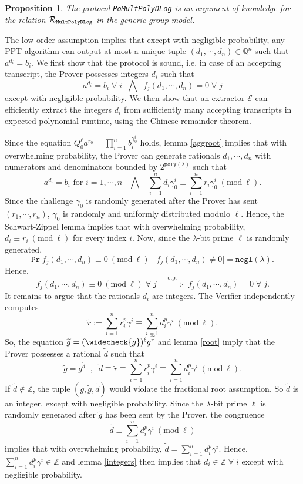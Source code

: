 \documentclass[11pt, lettersize, notitlepage, leqno, footskip=0.6cm]{article}
\newcommand{\bz}{\mathbb Z}
\newcommand{\bq}{\mathbb Q}
\newcommand{\slim}{\sum\limits}
\newcommand{\ttt}{\texttt}
\newcommand{\negl}{\ttt{{negl}}}
\newcommand{\impop}{\overset{\;\;\;\;\mr{o.p.}\;\;\;\;}{\Longrightarrow}}
\newcommand{\wti}{\widetilde}
\newcommand{\mc}{\mathcal}
\newcommand{\mr}{\mathrm}
\newcommand{\lam}{\lambda}
\newcommand{\weck}{\widecheck}
\newcommand{\vs}{\vspace{-0.15cm}}
\newcommand{\op}{overwhelming probability}
\newcommand{\np}{negligible probability}
\newcommand{\Mod}[1]{\ (\mathrm{mod}\ #1)}
\newcommand{\E}{\mc{E}}
\newtheorem{Prop}[Thm]{Proposition}
\numberwithin{equation}{section}
\begin{document}
\vspace{0.2cm}


\begin{Prop}\hyperlink{Mult} {The protocol} \verb|PoMultPolyDLog| is an argument of knowledge for the relation $\mc{R}_{{\tt{MultPolyDLog}}}$ in the generic group model.\end{Prop}

\begin{prf} The low order assumption implies that except with \np, any PPT algorithm can output at most a unique tuple $(d_1,\cdots,d_n)\in\bq^n$ such that $a^{d_i} = b_i$. We first show that the protocol is sound, i.e. in case of an accepting transcript, the Prover possesses integers $d_i$ such that $$a^{d_i} = b_i\;\forall\; i\;\;\bigwedge\;\;f_j(d_1,\cdots,d_n) = 0\;\forall\; j $$ except with \np.  We then show that an extractor $\E$ can efficiently extract the integers $d_i$ from sufficiently many accepting transcripts in expected polynomial runtime, using the Chinese remainder theorem.

Since the equation $Q_0^{\ell} a^{r_0} = \prod_{i=1}^n b_i^{\gamma_{0}^i}$ holds, lemma \ref{aggroot} implies that with \op, the Prover can generate rationals $d_1,\cdots,d_n$ with numerators and denominators bounded by $2^{\ttt{poly}(\lam)}$ such that \vs $$a^{d_i} = b_i \text{ for } i=1,\cdots,n \;\;\;\bigwedge\;\;\; \sum\limits_{i=1}^n d_i\gamma_{0}^i\equiv \sum\limits_{i=1}^n r_i\gamma_{0}^i\Mod{\ell}.$$ Since the challenge $\gamma_{0}$ is randomly generated after the Prover has sent $(r_1,\cdots,r_n)$, $\gamma_{0}$ is randomly and uniformly distributed modulo $\ell$. Hence, the Schwart-Zippel lemma implies that with \op, $d_i\equiv r_i\Mod{\ell}$ for every index $i$. Now, since the $\lam$-bit prime $\ell$ is randomly generated, \vs $$\ttt{Pr}\Big[f_j(d_1,\cdots,d_n)\equiv 0\Mod{\ell} \;\Big|\; f_j(d_1,\cdots,d_n)\neq 0 \Big] = \negl(\lam) .$$ Hence, $$f_j(d_1,\cdots,d_n)\equiv 0\Mod{\ell}\;\forall\;j\;\impop\; f_j(d_1,\cdots,d_n) = 0 \;\forall\;j.$$ It remains to argue that the rationals $d_i$ are integers. The Verifier independently computes $$\wti{r}:= \slim_{i=1}^n r_i^{p}\gamma^i\equiv \slim_{i=1}^n d_i^{p}\gamma^i\Mod{\ell}.$$ So, the equation $\wti{g} = (\weck{g})^{\ell}g^{\wti{r}} $ and lemma \ref{root} imply that the Prover possesses a rational $\wti{d}$ such that \vs $$\wti{g} = g^{\wti{d}}\;\;,\;\;\wti{d}\equiv \wti{r}\equiv \slim_{i=1}^n r_i^p\gamma^i\equiv \slim_{i=1}^n d_i^p\gamma^i\Mod{\ell}.$$ If $\wti{d}\notin\bz$, the tuple $(g, \wti{g}, \wti{d})$ would violate the fractional root assumption. So $\wti{d}$ is an integer, except with negligible probability. Since the $\lam$-bit prime $\ell$ is randomly generated after $\wti{g}$ has been sent by the Prover, the congruence \vs $$\wti{d}\equiv \slim_{i=1}^n d_i^p\gamma^i\Mod{\ell} $$ implies that with \op, $\wti{d} = \slim_{i=1}^n d_i^p\gamma^i.$ Hence, $\slim_{i=1}^n d_i^p\gamma^i\in \bz$ and lemma \ref{integers} then implies that $ d_i\in \bz\;\forall\;i$ except with negligible probability. 


\end{prf}
\end{document}
